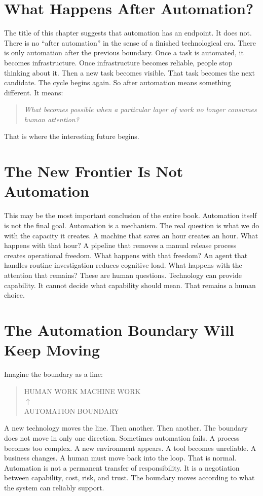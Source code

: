 \documentclass[11pt,twoside]{book}
\begin{document}
\section*{What Happens After Automation?}

The title of this chapter suggests that automation has an endpoint.
It does not.
There is no ``after automation'' in the sense of a finished technological era.
There is only automation after the previous boundary.
Once a task is automated, it becomes infrastructure.
Once infrastructure becomes reliable, people stop thinking about it.
Then a new task becomes visible.
That task becomes the next candidate.
The cycle begins again.
So after automation means something different.
It means:
\begin{quote}
\emph{What becomes possible when a particular layer of work no longer consumes human attention?}
\end{quote}
That is where the interesting future begins.

\section*{The New Frontier Is Not Automation}

This may be the most important conclusion of the entire book.
Automation itself is not the final goal.
Automation is a mechanism.
The real question is what we do with the capacity it creates.
A machine that saves an hour creates an hour.
What happens with that hour?
A pipeline that removes a manual release process creates operational freedom.
What happens with that freedom?
An agent that handles routine investigation reduces cognitive load.
What happens with the attention that remains?
These are human questions.
Technology can provide capability.
It cannot decide what capability should mean.
That remains a human choice.

\section*{The Automation Boundary Will Keep Moving}

Imagine the boundary as a line:
\begin{quote}
\centering
HUMAN WORK \textbar{} MACHINE WORK\\
$\uparrow$\\
AUTOMATION BOUNDARY
\end{quote}
A new technology moves the line.
Then another.
Then another.
The boundary does not move in only one direction.
Sometimes automation fails.
A process becomes too complex.
A new environment appears.
A tool becomes unreliable.
A business changes.
A human must move back into the loop.
That is normal.
Automation is not a permanent transfer of responsibility.
It is a negotiation between capability, cost, risk, and trust.
The boundary moves according to what the system can reliably support.
\end{document}
